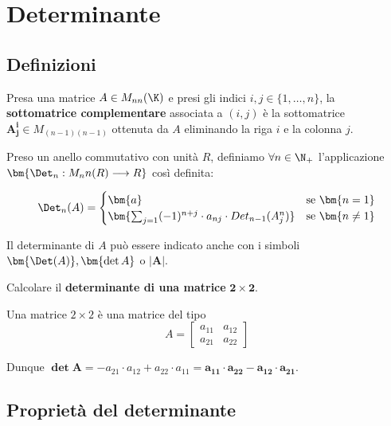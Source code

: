 \documentclass[11pt, a4paper, titlepage, oneside]{scrbook}
\begin{document}
\chapter{Determinante}

\section{Definizioni}

\begin{Definizione}
\label{def-sottomatrice-complementare}
Presa una matrice $A \in M_{nn}(\K)$ e presi gli indici $i,j \in \{1, \ldots, n\}$, la \textbf{sottomatrice complementare} associata a $(i,j)$ è la sottomatrice $\bm{A^i_j} \in M_{(n-1)(n-1)}$ ottenuta da $A$ eliminando la riga $i$ e la colonna $j$.
\end{Definizione}

\begin{Definizione}[Determinante]
\label{def-determinante}
Preso un anello commutativo con unità $R$, definiamo $\forall n \in \N_+$ l'applicazione $\bm{\Det_n: M_nn(R) \longrightarrow R}$ così definita:

\[
\Det_n(A) =
\begin{cases}
\bm{a} & \text{se } \bm{n = 1} \\
\bm{\sum_{j = 1} (-1)^{n+j} \cdot a_{nj} \cdot Det_{n-1}(A^n_j)} & \text{se } \bm{n \neq 1} 
\end{cases}
\]

\NB Il determinante di $A$ può essere indicato anche con i simboli $\bm{\Det(A)}, \bm{\det A}$ o $\bm{|A|}$.
\end{Definizione}

\Esempio \nopagebreak

Calcolare il \textbf{determinante di una matrice} $\bm{2 \times 2}$. \nopagebreak

Una matrice $2 \times 2$ è una matrice del tipo 
\[ A = 
\begin{bmatrix}
    a_{11} & a_{12} \\
    a_{21} & a_{22}
\end{bmatrix}
\]

Dunque $\bm{\det A} = -a_{21} \cdot a_{12} + a_{22} \cdot a_{11} = \bm{a_11 \cdot a_{22} - a_{12} \cdot a_{21}}$.

\section{Proprietà del determinante}
\end{document}
